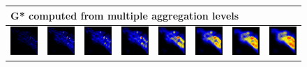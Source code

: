 \documentclass{itatnew}
\begin{document}
\begin{figure}[htp]
\begin{tabular}{cccccccc}
  \end{tabular}
  \begin{tabular}{cccccccc}
    \multicolumn{8}{l}{G* computed from multiple aggregation levels} \\
    \hline
    \vspace*{2mm}
    \includegraphics[width=4.6em]{images/gen-raw-zoom-gstar-1}&
    \includegraphics[width=4.6em]{images/gen-raw-zoom-gstar-2}&
    \includegraphics[width=4.6em]{images/gen-raw-zoom-gstar-3}&
    \includegraphics[width=4.6em]{images/gen-raw-zoom-gstar-4}&
    \includegraphics[width=4.6em]{images/gen-raw-zoom-gstar-5}&
    \includegraphics[width=4.6em]{images/gen-raw-zoom-gstar-6}&
    \includegraphics[width=4.6em]{images/gen-raw-zoom-gstar-7}&
    \includegraphics[width=4.6em]{images/gen-raw-zoom-gstar-8}

\end{tabular}
\end{figure}
\end{document}

